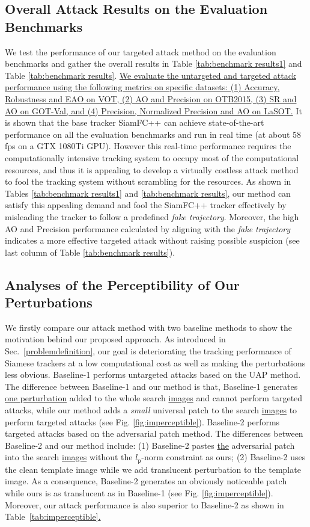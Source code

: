 \documentclass[journal]{IEEEtran}
\begin{document}
\subsection{Overall Attack Results on the Evaluation Benchmarks}

We test the performance of our targeted attack method on the evaluation benchmarks and gather the overall results in Table \ref{tab:benchmark results1} and Table \ref{tab:benchmark results}. \uline{We evaluate the untargeted and targeted attack performance using the following metrics on specific datasets: (1) Accuracy, Robustness and EAO on VOT, (2) AO and Precision on OTB2015, (3) SR and AO on GOT-Val, and (4) Precision, Normalized Precision and AO on LaSOT.} It is shown that the base tracker SiamFC++ can achieve state-of-the-art performance on all the evaluation benchmarks and run in real time (at about 58 fps on a GTX 1080Ti GPU). However this real-time performance requires the computationally intensive tracking system to occupy most of the computational resources, and thus it is appealing to develop a virtually costless attack method to fool the tracking system without scrambling for the resources. As shown in Tables \ref{tab:benchmark results1} and \ref{tab:benchmark results}, our method can satisfy this appealing demand and fool the SiamFC++ tracker effectively by misleading the tracker to follow a predefined \textit{fake trajectory}. Moreover, the high AO and Precision performance calculated by aligning with the \textit{fake trajectory} indicates a more effective targeted attack without raising possible suspicion (see last column of Table \ref{tab:benchmark results}).

\subsection{Analyses of the Perceptibility of Our Perturbations}

We firstly compare our attack method with two baseline methods to show the motivation behind our proposed approach. As introduced in Sec.~\ref{problemdefinition}, our goal is deteriorating the tracking performance of Siamese trackers at a low computational cost as well as making the perturbations less obvious.
Baseline-1 performs untargeted attacks based on the UAP \cite{UAP} method. The difference between Baseline-1 and our method is that, Baseline-1 generates \uline{one perturbation} added to the whole search \uline{images} and cannot perform targeted attacks, while our method adds a \textit{small} universal patch to the search \uline{images} to perform targeted attacks (see Fig. \ref{fig:imperceptible}). Baseline-2 performs targeted attacks based on the adversarial patch \cite{patch} method. The differences between Baseline-2 and our method include: (1) Baseline-2 pastes \uline{the} adversarial patch into the search \uline{images} without the $l_{\mathsf{p}}\text{-norm}$ constraint as ours; (2) Baseline-2 uses the clean template image while we add translucent perturbation to the template image. As a consequence, Baseline-2 generates an obviously noticeable patch while ours is as translucent as in Baseline-1 (see Fig. \ref{fig:imperceptible}). Moreover, our attack performance is also superior to Baseline-2 as shown in Table~\ref{tab:imperceptible}\uline{.}
\end{document}
